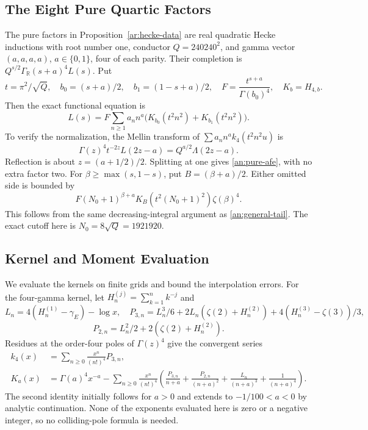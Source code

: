 \subsection{The Eight Pure Quartic Factors}
\label{an:pure}

The pure factors in Proposition~\ref{ar:hecke-data} are real quadratic
Hecke inductions with root number one, conductor $Q=240240^2$, and
gamma vector $(a,a,a,a)$, $a\in\{0,1\}$, four of each parity.
Their completion is $Q^{s/2}\Gamma_{\mathbb R}(s+a)^4L(s)$.
Put
\[
 t=\pi^2/\sqrt Q,\quad b_0=(s+a)/2,\quad b_1=(1-s+a)/2,
 \quad F=\frac{t^{s+a}}{\Gamma(b_0)^4},\quad K_b=H_{4,b}.
\]
Then the exact functional equation is
\begin{equation}\label{an:pure-afe}
 L(s)=F\sum_{n\geq1}a_n n^a
       \bigl(K_{b_0}(t^2n^2)+K_{b_1}(t^2n^2)\bigr).
\end{equation}
To verify the normalization, the Mellin transform of
$\sum a_n n^a k_4(t^2n^2u)$ is
\[
 \Gamma(z)^4t^{-2z}L(2z-a)=Q^{a/2}\Lambda(2z-a).
\]
Reflection is about $z=(a+1/2)/2$. Splitting at one gives
\eqref{an:pure-afe}, with no extra factor two.
For $\beta\geq\max(s,1-s)$, put $B=(\beta+a)/2$. Either omitted
side is bounded by
\begin{equation}\label{an:pure-tail}
 F(N_0+1)^{\beta+a}K_B(t^2(N_0+1)^2)\zeta(\beta)^4.
\end{equation}
This follows from the same decreasing-integral argument as
\eqref{an:general-tail}. The exact cutoff here is
$N_0=8\sqrt Q=1921920$.

\subsection{Kernel and Moment Evaluation}
\label{an:kernel-enclosures}

We evaluate the kernels on finite grids and bound the interpolation
errors. For the four-gamma kernel, let
$H_n^{(j)}=\sum_{k=1}^n k^{-j}$ and
\[
 L_n=4(H_n^{(1)}-\gamma_E)-\log x,\quad
 P_{3,n}=L_n^3/6+2L_n(\zeta(2)+H_n^{(2)})
                     +4(H_n^{(3)}-\zeta(3))/3,
\]
\[
 P_{2,n}=L_n^2/2+2(\zeta(2)+H_n^{(2)}).
\]
Residues at the order-four poles of $\Gamma(z)^4$ give the convergent
series
\begin{align}
 k_4(x)&=\sum_{n\geq0}\frac{x^n}{(n!)^4}P_{3,n},
 \label{an:k4-series}\\
 K_a(x)&=\Gamma(a)^4x^{-a}-
 \sum_{n\geq0}\frac{x^n}{(n!)^4}
 \left(\frac{P_{3,n}}{n+a}+\frac{P_{2,n}}{(n+a)^2}
       +\frac{L_n}{(n+a)^3}+\frac1{(n+a)^4}\right).
 \label{an:K4-series}
\end{align}
The second identity initially follows for $a>0$ and extends to
$-1/100<a<0$ by analytic continuation. None of the exponents evaluated
here is zero or a negative integer, so no colliding-pole formula is
needed.

